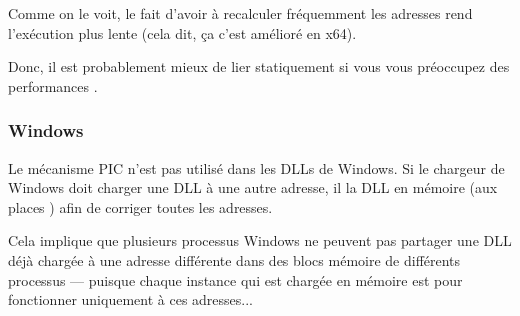 Comme on le voit, le fait d'avoir à recalculer fréquemment les adresses rend l'exécution plus lente
(cela dit, ça c'est amélioré en x64).

Donc, il est probablement mieux de lier statiquement si vous vous préoccupez des performances .

\subsubsection{Windows}

Le mécanisme PIC n'est pas utilisé dans les DLLs de Windows. Si le chargeur de Windows doit charger une DLL
à une autre adresse, il  la DLL en mémoire (aux places ) afin de corriger toutes les
adresses.

Cela implique que plusieurs processus Windows ne peuvent pas partager une DLL déjà chargée à une adresse différente
dans des blocs mémoire de différents processus --- puisque chaque instance qui est chargée en mémoire est  pour 
fonctionner uniquement à ces adresses...

